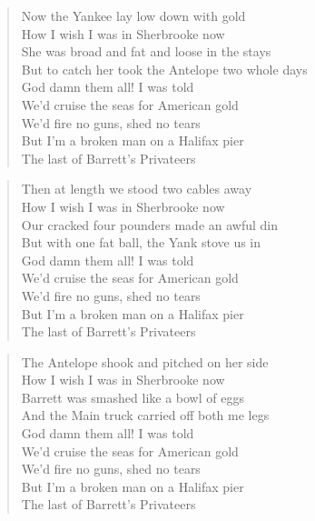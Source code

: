 \documentclass[8pt,twoside]{extarticle}
\newenvironment{xverse}{
	\interlinepenalty 10000
	\begin{verse}
	\begin{minipage}{\linewidth}
	\parskip 5pt
	\vspace{-6pt}
	}
	{
	\end{minipage}
	\end{verse}
	\penalty 0
	\vspace{-6pt}
	}
\begin{document}
\begin{xverse}
Now the Yankee lay low down with gold \\
How I wish I was in Sherbrooke now \\
She was broad and fat and loose in the stays \\
But to catch her took the Antelope two whole days \\
God damn them all! I was told \\
We'd cruise the seas for American gold \\
We'd fire no guns, shed no tears \\
But I'm a broken man on a Halifax pier \\
The last of Barrett's Privateers \\
\end{xverse}

\begin{xverse}
Then at length we stood two cables away \\
How I wish I was in Sherbrooke now \\
Our cracked four pounders made an awful din \\
But with one fat ball, the Yank stove us in \\
God damn them all! I was told \\
We'd cruise the seas for American gold \\
We'd fire no guns, shed no tears \\
But I'm a broken man on a Halifax pier \\
The last of Barrett's Privateers \\
\end{xverse}

\begin{xverse}
The Antelope shook and pitched on her side \\
How I wish I was in Sherbrooke now \\
Barrett was smashed like a bowl of eggs \\
And the Main truck carried off both me legs \\
God damn them all! I was told \\
We'd cruise the seas for American gold \\
We'd fire no guns, shed no tears \\
But I'm a broken man on a Halifax pier \\
The last of Barrett's Privateers \\
\end{xverse}
\end{document}
